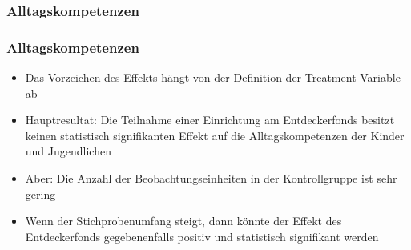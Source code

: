 \begin{frame}[fragile]
\frametitle{Alltagskompetenzen}
\begin{table}
\begin{center}
\end{center}
\caption{DID-Schätzung: Ergebnisse für Alltagskompetenzen}
\end{table}
\end{frame}

\begin{frame}[fragile]
\frametitle{Alltagskompetenzen}
\begin{itemize}
\item Das Vorzeichen des Effekts hängt von der Definition der Treatment-Variable ab
\item Hauptresultat: Die Teilnahme einer Einrichtung am Entdeckerfonds besitzt keinen statistisch signifikanten Effekt auf die Alltagskompetenzen der Kinder und Jugendlichen
\item Aber: Die Anzahl der Beobachtungseinheiten in der Kontrollgruppe ist sehr gering
\item Wenn der Stichprobenumfang steigt, dann könnte der Effekt des Entdeckerfonds gegebenenfalls positiv und statistisch signifikant werden
\end{itemize}
\end{frame}


